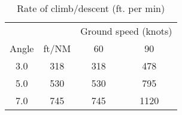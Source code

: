 {}

{}

\begin{table}[ht]
    \caption{Rate of climb/descent (ft. per min)}

    \begin{center}
        \begin{tabular}{cccc}
            \toprule
                             &       & \multicolumn{2}{c}{Ground speed (knots)}
            \\\cmidrule(lr){3-4}
            Angle            & ft/NM & 60                                       & 90   \\
            \midrule
            3.0\textdegree{} & 318   & 318                                      & 478  \\
            5.0\textdegree{} & 530   & 530                                      & 795  \\
            7.0\textdegree{} & 745   & 745                                      & 1120 \\
        \end{tabular}
    \end{center}
\end{table}

{}

